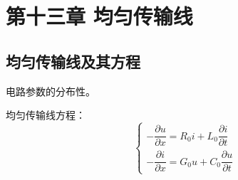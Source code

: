 \chapter{第十三章 均匀传输线}

\section{均匀传输线及其方程}
电路参数的分布性。

均匀传输线方程：
\[
\begin{cases}
-\dfrac{\partial u}{\partial x} = R_0 i + L_0 \dfrac{\partial i}{\partial t} \\
-\dfrac{\partial i}{\partial x} = G_0 u + C_0 \dfrac{\partial u}{\partial t}
\end{cases}
\]

